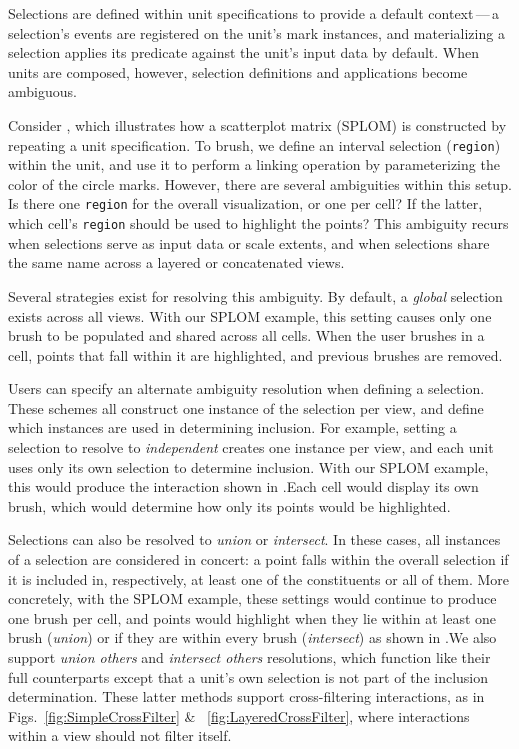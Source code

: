 Selections are defined within unit specifications to provide a default
context\,---\,a selection's events are registered on the unit's mark instances,
and materializing a selection applies its predicate against the unit's input
data by default. When units are composed, however, selection definitions and
applications become ambiguous.

Consider , which illustrates how a scatterplot matrix
(SPLOM) is constructed by repeating a unit specification. To brush, we define an
interval selection (\texttt{region}) within the unit, and use it to perform a
linking operation by parameterizing the color of the circle marks. However,
there are several ambiguities within this setup. Is there one \texttt{region}
for the overall visualization, or one per cell? If the latter, which cell's
\texttt{region} should be used to highlight the points?  This ambiguity recurs
when selections serve as input data or scale extents, and when selections share
the same name across a layered or concatenated views.

Several strategies exist for resolving this ambiguity. By default, a
\emph{global} selection exists across all views. With our SPLOM example, this
setting causes only one brush to be populated and shared across all cells. When
the user brushes in a cell, points that fall within it are highlighted, and
previous brushes are removed.

Users can specify an alternate ambiguity resolution when defining a selection.
These schemes all construct one instance of the selection per view, and define
which instances are used in determining inclusion. For example, setting a
selection to resolve to \emph{independent} creates one instance per view, and
each unit uses only its own selection to determine inclusion. With our SPLOM
example, this would produce the interaction shown in .Each cell would display its own brush, which would determine how only its points
would be highlighted.

Selections can also be resolved to \emph{union} or \emph{intersect}. In these
cases, all instances of a selection are considered in concert: a point falls
within the overall selection if it is included in, respectively, at least one of
the constituents or all of them. More concretely, with the SPLOM example, these
settings would continue to produce one brush per cell, and points would
highlight when they lie within at least one brush (\emph{union}) or if they are
within every brush (\emph{intersect}) as shown in .We also support \emph{union others} and \emph{intersect others} resolutions,
which function like their full counterparts except that a unit's own selection
is not part of the inclusion determination. These latter methods support
cross-filtering interactions, as in Figs.~\ref{fig:SimpleCrossFilter} \&
~\ref{fig:LayeredCrossFilter}, where interactions within a view should not
filter itself.